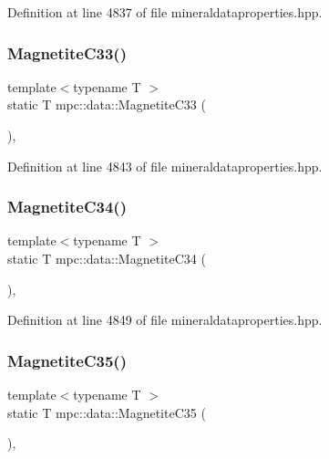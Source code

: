 Definition at line 4837 of file mineraldataproperties.\+hpp.

\mbox{\label{namespacempc_1_1data_ac20ca5aa06f9db3396f14871260f36f9}} 
\subsubsection{\texorpdfstring{Magnetite\+C33()}{MagnetiteC33()}}
{\footnotesize\ttfamily template$<$typename T $>$ \\
static T mpc\+::data\+::\+Magnetite\+C33 (\begin{DoxyParamCaption}{ }\end{DoxyParamCaption})\hspace{0.3cm}{\ttfamily [inline]}, {\ttfamily [static]}}



Definition at line 4843 of file mineraldataproperties.\+hpp.

\mbox{\label{namespacempc_1_1data_aa9ada3fe75469548bcdb02dfec25292b}} 
\subsubsection{\texorpdfstring{Magnetite\+C34()}{MagnetiteC34()}}
{\footnotesize\ttfamily template$<$typename T $>$ \\
static T mpc\+::data\+::\+Magnetite\+C34 (\begin{DoxyParamCaption}{ }\end{DoxyParamCaption})\hspace{0.3cm}{\ttfamily [inline]}, {\ttfamily [static]}}



Definition at line 4849 of file mineraldataproperties.\+hpp.

\mbox{\label{namespacempc_1_1data_afe23103e9af24514feba9b23f20736d1}} 
\subsubsection{\texorpdfstring{Magnetite\+C35()}{MagnetiteC35()}}
{\footnotesize\ttfamily template$<$typename T $>$ \\
static T mpc\+::data\+::\+Magnetite\+C35 (\begin{DoxyParamCaption}{ }\end{DoxyParamCaption})\hspace{0.3cm}{\ttfamily [inline]}, {\ttfamily [static]}}



